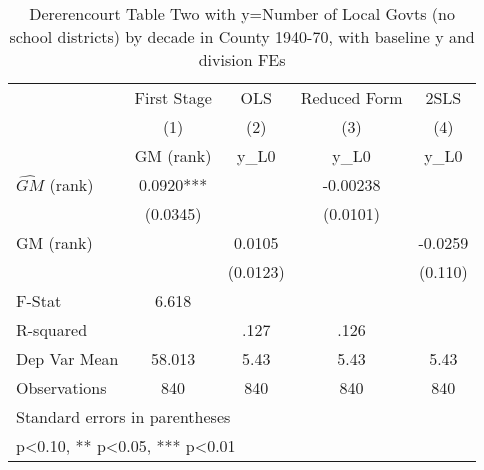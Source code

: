 \begin{table}[htbp]\centering
\def\sym#1{\ifmmode^{#1}\else\(^{#1}\)\fi}
\caption{Dererencourt Table Two with y=Number of Local Govts (no school districts) by decade in County 1940-70, with baseline y and division FEs}
\begin{tabular}{l*{4}{c}}
\toprule
                    & First Stage   &         OLS   &Reduced Form   &        2SLS   \\
                    &\multicolumn{1}{c}{(1)}&\multicolumn{1}{c}{(2)}&\multicolumn{1}{c}{(3)}&\multicolumn{1}{c}{(4)}\\
                    &\multicolumn{1}{c}{GM  (rank)}&\multicolumn{1}{c}{y\_L0}&\multicolumn{1}{c}{y\_L0}&\multicolumn{1}{c}{y\_L0}\\
\midrule
$\hat{GM}$ (rank)   &      0.0920***&               &    -0.00238   &               \\
                    &    (0.0345)   &               &    (0.0101)   &               \\
\addlinespace
GM  (rank)          &               &      0.0105   &               &     -0.0259   \\
                    &               &    (0.0123)   &               &     (0.110)   \\
\midrule
F-Stat              &       6.618   &               &               &               \\
R-squared           &               &        .127   &        .126   &               \\
Dep Var Mean        &      58.013   &        5.43   &        5.43   &        5.43   \\
Observations        &         840   &         840   &         840   &         840   \\
\bottomrule
\multicolumn{5}{l}{\footnotesize Standard errors in parentheses}\\
\multicolumn{5}{l}{\footnotesize * p<0.10, ** p<0.05, *** p<0.01}\\
\end{tabular}
\end{table}
